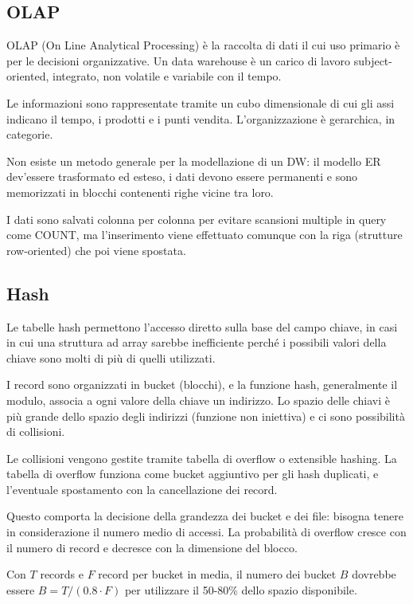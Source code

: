 \subsection{OLAP}
OLAP (On Line Analytical Processing) è la raccolta di dati il cui uso primario è per le decisioni organizzative. Un data warehouse è un carico di lavoro subject-oriented, integrato, non volatile e variabile con il tempo. 
	
Le informazioni sono rappresentate tramite un cubo dimensionale di cui gli assi indicano il tempo, i prodotti e i punti vendita. L'organizzazione è gerarchica, in categorie.

Non esiste un metodo generale per la modellazione di un DW: il modello ER dev'essere trasformato ed esteso, i dati devono essere permanenti e sono memorizzati in blocchi contenenti righe vicine tra loro. 

I dati sono salvati colonna per colonna per evitare scansioni multiple in query come COUNT, ma l'inserimento viene effettuato comunque con la riga (strutture row-oriented) che poi viene spostata.

\subsection{Hash}
Le tabelle hash permettono l'accesso diretto sulla base del campo chiave, in casi in cui una struttura ad array sarebbe inefficiente perché i possibili valori della chiave sono molti di più di quelli utilizzati.

I record sono organizzati in bucket (blocchi), e la funzione hash, generalmente il modulo, associa a ogni valore della chiave un indirizzo. Lo spazio delle chiavi è più grande dello spazio degli indirizzi (funzione non iniettiva) e ci sono possibilità di collisioni.

Le collisioni vengono gestite tramite tabella di overflow o extensible hashing. La tabella di overflow funziona come bucket aggiuntivo per gli hash duplicati, e l'eventuale spostamento con la cancellazione dei record.

Questo comporta la decisione della grandezza dei bucket e dei file: bisogna tenere in considerazione il numero medio di accessi. La probabilità di overflow cresce con il numero di record e decresce con la dimensione del blocco. 

Con $T$ records e $F$ record per bucket in media, il numero dei bucket $B$ dovrebbe essere $B = T / (0.8 \cdot F)$ per utilizzare il 50-80\% dello spazio disponibile.

